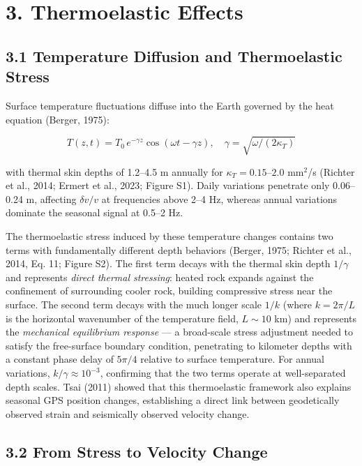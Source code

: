 \documentclass[draft]{agujournal2019}
\begin{document}
\section{3. Thermoelastic Effects}\label{thermoelastic-effects}

\subsection{3.1 Temperature Diffusion and Thermoelastic
Stress}\label{temperature-diffusion-and-thermoelastic-stress}

Surface temperature fluctuations diffuse into the Earth governed by the
heat equation (Berger, 1975):

\[T(z,t) = T_0 \, e^{-\gamma z} \cos(\omega t - \gamma z), \quad \gamma = \sqrt{\omega/(2\kappa_T)} \tag{8}\]

with thermal skin depths of 1.2--4.5 m annually for
\(\kappa_T = 0.15\)--\(2.0\) mm\(^2\)/s (Richter et al., 2014; Ermert et
al., 2023; Figure S1). Daily variations penetrate only 0.06--0.24 m,
affecting \(\delta v/v\) at frequencies above 2--4 Hz, whereas annual
variations dominate the seasonal signal at 0.5--2 Hz.

The thermoelastic stress induced by these temperature changes contains
two terms with fundamentally different depth behaviors (Berger, 1975;
Richter et al., 2014, Eq. 11; Figure S2). The first term decays with the
thermal skin depth \(1/\gamma\) and represents \emph{direct thermal
stressing}: heated rock expands against the confinement of surrounding
cooler rock, building compressive stress near the surface. The second
term decays with the much longer scale \(1/k\) (where \(k = 2\pi/L\) is
the horizontal wavenumber of the temperature field, \(L \sim 10\) km)
and represents the \emph{mechanical equilibrium response} --- a
broad-scale stress adjustment needed to satisfy the free-surface
boundary condition, penetrating to kilometer depths with a constant
phase delay of \(5\pi/4\) relative to surface temperature. For annual
variations, \(k/\gamma \approx 10^{-3}\), confirming that the two terms
operate at well-separated depth scales. Tsai (2011) showed that this
thermoelastic framework also explains seasonal GPS position changes,
establishing a direct link between geodetically observed strain and
seismically observed velocity change.

\subsection{3.2 From Stress to Velocity
Change}\label{from-stress-to-velocity-change}
\end{document}
